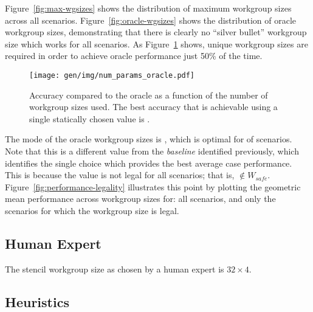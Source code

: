 Figure~\ref{fig:max-wgsizes} shows the distribution of maximum
workgroup sizes across all scenarios. Figure~\ref{fig:oracle-wgsizes}
shows the distribution of oracle workgroup sizes, demonstrating that
there is clearly no ``silver bullet'' workgroup size which works for
all scenarios. As Figure~\ref{fig:oracle-accuracy} shows,
 unique workgroup sizes are
required in order to achieve oracle performance just 50\% of the
time.

\begin{figure}
\centering
\texttt{[image: gen/img/num\_params\_oracle.pdf]}
\caption{%
  Accuracy compared to the oracle as a function of the number of
  workgroup sizes used. The best accuracy that is achievable using a
  single statically chosen value is
  \protect.%
}
\label{fig:oracle-accuracy}
\end{figure}

The mode of the oracle workgroup sizes is
, which is optimal for
 of scenarios. Note that this is
a different value from the \emph{baseline} identified previously,
which identifies the single choice which provides the best average
case performance. This is because the value is not legal for all
scenarios; that is, $ \not\in W_{safe}$.
Figure~\ref{fig:performance-legality} illustrates this point by
plotting the geometric mean performance across workgroup sizes for:
all scenarios, and only the scenarios for which the workgroup size is
legal.




\subsection{Human Expert}


The stencil workgroup size as chosen by a human expert is
$32 \times 4$.




\subsection{Heuristics}

